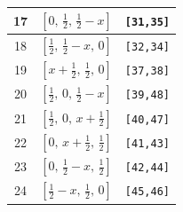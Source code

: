\documentclass[fleqn,8pt]{jsarticle}
\begin{document}
\begin{longtable}{ccc}
17 & $\left[ 0,\, \frac{1}{2},\, \frac{1}{2} - x \right]$ & {\tt [31,35]} \\ \hline
18 & $\left[ \frac{1}{2},\, \frac{1}{2} - x,\, 0 \right]$ & {\tt [32,34]} \\ \hline
19 & $\left[ x + \frac{1}{2},\, \frac{1}{2},\, 0 \right]$ & {\tt [37,38]} \\ \hline
20 & $\left[ \frac{1}{2},\, 0,\, \frac{1}{2} - x \right]$ & {\tt [39,48]} \\ \hline
21 & $\left[ \frac{1}{2},\, 0,\, x + \frac{1}{2} \right]$ & {\tt [40,47]} \\ \hline
22 & $\left[ 0,\, x + \frac{1}{2},\, \frac{1}{2} \right]$ & {\tt [41,43]} \\ \hline
23 & $\left[ 0,\, \frac{1}{2} - x,\, \frac{1}{2} \right]$ & {\tt [42,44]} \\ \hline
24 & $\left[ \frac{1}{2} - x,\, \frac{1}{2},\, 0 \right]$ & {\tt [45,46]} \\
\end{longtable}
\renewcommand{\arraystretch}{1.2}
\end{document}
